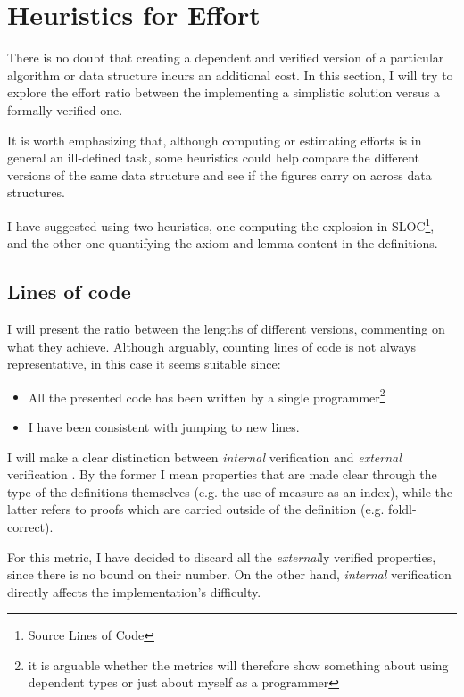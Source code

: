 \documentclass[12pt,twoside,notitlepage]{report}
\begin{document}
\section{Heuristics for Effort}

There is no doubt that creating a dependent and verified version of a particular algorithm or data structure incurs an additional cost. In this section, I will try to explore the effort ratio between the implementing a simplistic solution versus a formally verified one. 

It is worth emphasizing that, although computing or estimating efforts is in general an ill-defined task, some heuristics could help compare the different versions of the same data structure and see if the figures carry on across data structures.

I have suggested using two heuristics, one computing the explosion in SLOC\footnote{Source Lines of Code}, and the other one quantifying the axiom and lemma content in the definitions.

\subsection{Lines of code}

I will present the ratio between the lengths of different versions, commenting on what they achieve. Although arguably, counting lines of code is not always representative, in this case it seems suitable since: 
\begin{itemize}
\item All the presented code has been written by a single programmer\footnote{it is arguable whether the metrics will therefore show something about using dependent types or just about myself as a programmer}
\item I have been consistent with jumping to new lines.
\end{itemize}
	
I will make a clear distinction between \textit{internal} verification and \textit{external} verification \cite{agdabook}. By the former I mean properties that are made clear through the type of the definitions themselves (e.g. the use of measure as an index), while the latter refers to proofs which are carried outside of the definition (e.g. foldl-correct).

For this metric, I have decided to discard all the \textit{external}ly verified properties, since there is no bound on their number. On the other hand, \textit{internal} verification directly affects the implementation's difficulty.
\end{document}
